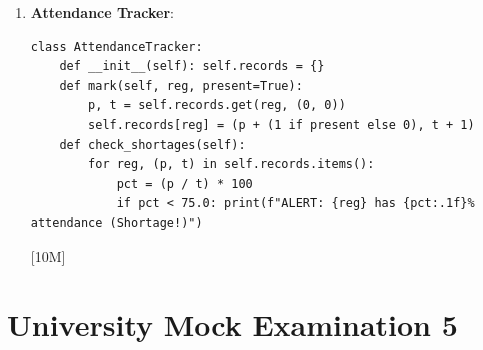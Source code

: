 \begin{solutionbox}
\begin{enumerate}[start=17]
\begin{lstlisting}[language=Python3]
import csv
def process_scores(filename):
    scores = []
    with open(filename, "r") as f:
        reader = csv.reader(f)
        next(reader) # Skip header
        for row in reader: scores.append(float(row[1]))
    n = len(scores)
    mean = sum(scores) / n
    scores.sort()
    med = scores[n//2] if n % 2 != 0 else (scores[n//2-1]+scores[n//2])/2
    var = sum((x - mean)**2 for x in scores) / n
    return mean, med, var
    \end{lstlisting} [10M]
    \item \textbf{Attendance Tracker}:
    \begin{lstlisting}[language=Python3]
class AttendanceTracker:
    def __init__(self): self.records = {}
    def mark(self, reg, present=True):
        p, t = self.records.get(reg, (0, 0))
        self.records[reg] = (p + (1 if present else 0), t + 1)
    def check_shortages(self):
        for reg, (p, t) in self.records.items():
            pct = (p / t) * 100
            if pct < 75.0: print(f"ALERT: {reg} has {pct:.1f}% attendance (Shortage!)")
    \end{lstlisting} [10M]
\end{enumerate}
\end{solutionbox}

\section{University Mock Examination 5}

